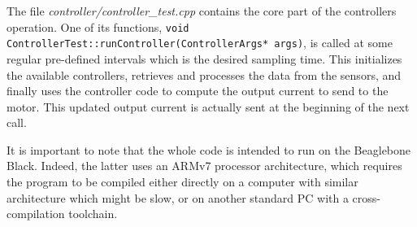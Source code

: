 The file \textit{controller/controller\_test.cpp} contains the core part of the controllers operation. One of its functions, \lstinline[style=customcppinline]{void ControllerTest::runController(ControllerArgs* args)}, is called at some regular pre-defined intervals which is the desired sampling time. This initializes the available controllers, retrieves and processes the data from the sensors, and finally uses the controller code to compute the output current to send to the motor. This updated output current is actually sent at the beginning of the next call.

It is important to note that the whole code is intended to run on the Beaglebone Black. Indeed, the latter uses an ARMv7 processor architecture, which requires the program to be compiled either directly on a computer with similar architecture which might be slow, or on another standard PC with a cross-compilation toolchain\cite{ELinux}.
\\\\